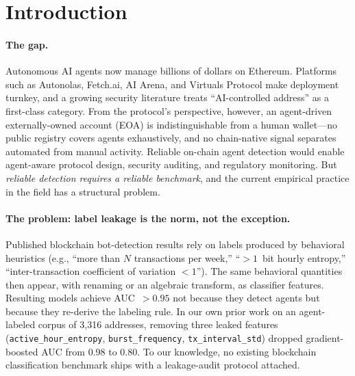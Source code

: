 \documentclass[10pt]{article}
\begin{document}
\section{Introduction}
\label{sec:intro}

\paragraph{The gap.}
Autonomous AI agents now manage billions of dollars on Ethereum. Platforms such as Autonolas, Fetch.ai, AI Arena, and Virtuals Protocol make deployment turnkey, and a growing security literature treats ``AI-controlled address'' as a first-class category. From the protocol's perspective, however, an agent-driven externally-owned account (EOA) is indistinguishable from a human wallet---no public registry covers agents exhaustively, and no chain-native signal separates automated from manual activity. Reliable on-chain agent detection would enable agent-aware protocol design, security auditing, and regulatory monitoring. But \emph{reliable detection requires a reliable benchmark}, and the current empirical practice in the field has a structural problem.

\paragraph{The problem: label leakage is the norm, not the exception.}
Published blockchain bot-detection results rely on labels produced by behavioral heuristics (e.g., ``more than $N$ transactions per week,'' ``$>1$~bit hourly entropy,'' ``inter-transaction coefficient of variation $<1$''). The same behavioral quantities then appear, with renaming or an algebraic transform, as classifier features. Resulting models achieve AUC~$>0.95$ not because they detect agents but because they re-derive the labeling rule. In our own prior work on an agent-labeled corpus of 3{,}316 addresses, removing three leaked features (\texttt{active\_hour\_entropy}, \texttt{burst\_frequency}, \texttt{tx\_interval\_std}) dropped gradient-boosted AUC from 0.98 to 0.80. To our knowledge, no existing blockchain classification benchmark ships with a leakage-audit protocol attached.
\end{document}

